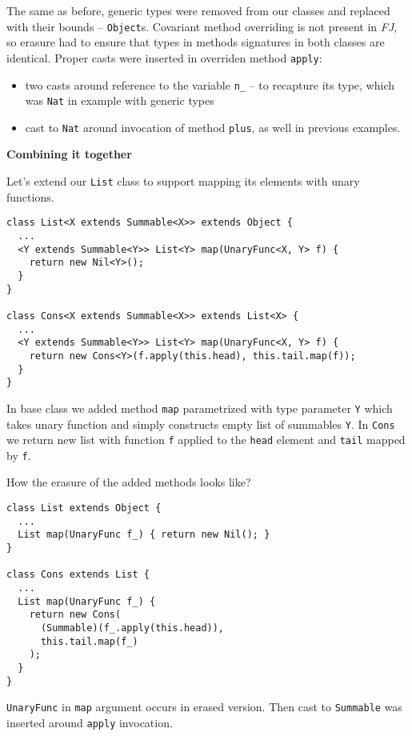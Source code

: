 \documentclass{article}[12pt]
\begin{document}
The same as before, generic types were removed from our classes
and replaced with their bounds -- \texttt{Object}s. Covariant
method overriding is not present in \emph{FJ}, so erasure had
to ensure that types in methods signatures in both classes are
identical. Proper casts were inserted in overriden method
\texttt{apply}:

\begin{itemize}
\item two casts around reference to the variable \texttt{n\_} --
  to recapture its type, which was \texttt{Nat} in example with
  generic types
\item cast to \texttt{Nat} around invocation of method
  \texttt{plus}, as well in previous examples.
\end{itemize}
\textbf{Combining it together}

Let's extend our \texttt{List} class to support mapping its
elements with unary functions.

\begin{verbatim}
class List<X extends Summable<X>> extends Object {
  ...
  <Y extends Summable<Y>> List<Y> map(UnaryFunc<X, Y> f) {
    return new Nil<Y>();
  }
}

class Cons<X extends Summable<X>> extends List<X> {
  ...
  <Y extends Summable<Y>> List<Y> map(UnaryFunc<X, Y> f) {
    return new Cons<Y>(f.apply(this.head), this.tail.map(f));
  }
}
\end{verbatim}

In base class we added method \texttt{map} parametrized with
type parameter \texttt{Y} which takes unary function and simply
constructs empty list of summables \texttt{Y}. In \texttt{Cons}
we return new list with function \texttt{f} applied to the
\texttt{head} element and \texttt{tail} mapped by \texttt{f}.

How the erasure of the added methods looks like?

\begin{verbatim}
class List extends Object {
  ...
  List map(UnaryFunc f_) { return new Nil(); }
}

class Cons extends List {
  ...
  List map(UnaryFunc f_) {
    return new Cons(
      (Summable)(f_.apply(this.head)),
      this.tail.map(f_)
    );     
  }
}
\end{verbatim}

\texttt{UnaryFunc} in \texttt{map} argument occurs in erased
version. Then cast to \texttt{Summable} was inserted around
\texttt{apply} invocation.
\end{document}
